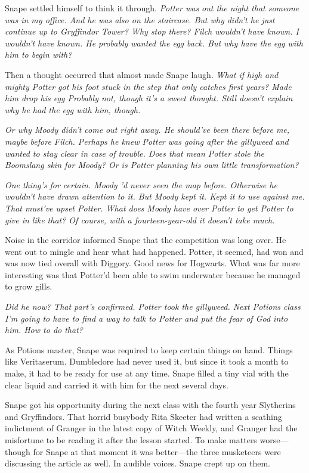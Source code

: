 Snape settled himself to think it through. \emph{Potter was out the night that someone was in my office. And he was also on the staircase. But why didn't he just continue up to Gryffindor Tower? Why stop there? Filch wouldn't have known. I wouldn't have known. He probably wanted the egg back. But why have the egg with him to begin with?}

Then a thought occurred that almost made Snape laugh. \emph{What if high and mighty Potter got his foot stuck in the step that only catches first years? Made him drop his egg{\el} Probably not, though it's a sweet thought. Still doesn't explain why he had the egg with him, though.}

\emph{Or why Moody didn't come out right away. He should've been there before me, maybe before Filch. Perhaps he knew Potter was going after the gillyweed and wanted to stay clear in case of trouble. Does that mean Potter stole the Boomslang skin for Moody? Or is Potter planning his own little transformation?}

\emph{One thing's for certain. Moody 'd never seen the map before. Otherwise he wouldn't have drawn attention to it. But Moody kept it. Kept it to use against me. That must've upset Potter. What does Moody have over Potter to get Potter to give in like that? Of course, with a fourteen-year-old it doesn't take much.}

Noise in the corridor informed Snape that the competition was long over. He went out to mingle and hear what had happened. Potter, it seemed, had won and was now tied overall with Diggory. Good news for Hogwarts. What was far more interesting was that Potter'd been able to swim underwater because he managed to grow gills.

\emph{Did he now? That part's confirmed. Potter took the gillyweed. Next Potions class I'm going to have to find a way to talk to Potter and put the fear of God into him. How to do that?}

As Potions master, Snape was required to keep certain things on hand. Things like Veritaserum. Dumbledore had never used it, but since it took a month to make, it had to be ready for use at any time. Snape filled a tiny vial with the clear liquid and carried it with him for the next several days.

Snape got his opportunity during the next class with the fourth year Slytherins and Gryffindors. That horrid busybody Rita Skeeter had written a scathing indictment of Granger in the latest copy of Witch Weekly, and Granger had the misfortune to be reading it after the lesson started. To make matters worse—though for Snape at that moment it was better—the three musketeers were discussing the article as well. In audible voices. Snape crept up on them.

